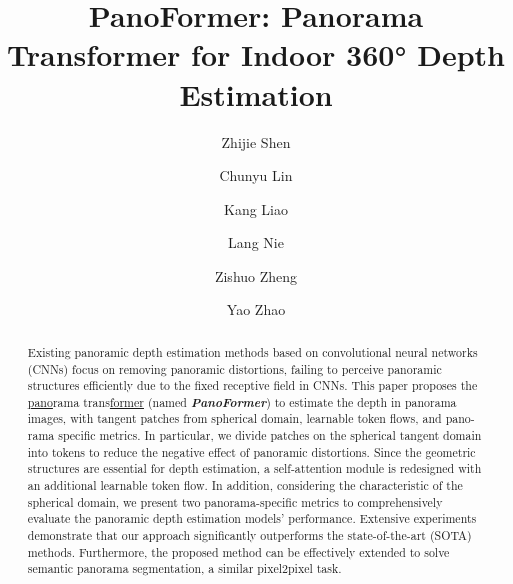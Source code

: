 \documentclass[runningheads]{llncs}
\begin{document}
\pagestyle{headings}
\mainmatter
\def\ECCVSubNumber{100}  

\title{PanoFormer: Panorama Transformer for Indoor 360° Depth Estimation} 

\begin{comment}
\titlerunning{ECCV-22 submission ID \ECCVSubNumber} 
\authorrunning{ECCV-22 submission ID \ECCVSubNumber} 
\author{Anonymous ECCV submission}
\institute{Paper ID \ECCVSubNumber}
\end{comment}


\author{Zhijie Shen \and
Chunyu Lin \and
Kang Liao\and
Lang Nie\and
Zishuo Zheng\and
Yao Zhao}
\maketitle
\begin{abstract}
Existing panoramic depth estimation methods based on convolutional neural networks (CNNs) focus on removing panoramic distortions, failing to perceive panoramic structures efficiently due to the fixed receptive field in CNNs. This paper proposes the \uline{pano}rama trans\uline{former} (named \textbf{\textit{PanoFormer}}) to estimate the depth in panorama images, with tangent patches from spherical domain, learnable token flows, and pano-rama specific metrics. In particular, we divide patches on the spherical tangent domain into tokens to reduce the negative effect of panoramic distortions. Since the geometric structures are essential for depth estimation, a self-attention module is redesigned with an additional learnable token flow. In addition, considering the characteristic of the spherical domain, we present two panorama-specific metrics to comprehensively evaluate the panoramic depth estimation models' performance. 
Extensive experiments demonstrate that our approach significantly outperforms the state-of-the-art (SOTA) methods. Furthermore, the proposed method can be effectively extended to solve semantic panorama segmentation, a similar pixel2pixel task.
\end{abstract}
\end{document}
